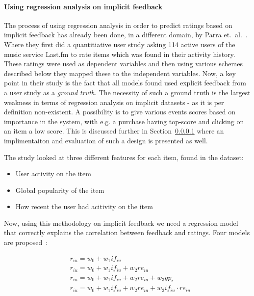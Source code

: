 \paragraph{Using regression analysis on implicit feedback}

The process of using regression analysis in order to predict ratings based on
implicit feedback has already been done, in a different domain, by Parra et.\
al.~\cite{parra2011walk}. Where they first did a quantitiative user study
asking 114 active users of the music service Last.fm to rate items which was
found in their activity history. These ratings were used as dependent variables
and then using various schemes described below they mapped these to the
independent variables. Now, a key point in their study is the fact that all
models found used explicit feedback from a user study as a \textit{ground
truth}. The necessity of such a ground truth is the largest weakness in terms
of regression analysis on implicit datasets - as it is per definition
non-existent. A possibility is to give various events scores based on
importance in the system, with e.g. a purchase having top-score and clicking on
an item a low score. This is discussed further in Section~\ref{} where an
implimentaiton and evaluation of such a design is presented as well.

The study looked at three different features for each item, found in the
dataset:

\begin{itemize}
  \item User activity on the item
  \item Global popularity of the item
  \item How recent the user had acitivity on the item
\end{itemize}

Now, using this methodology on implicit feedback we need a regression model that
correctly explains the correlation between feedback and ratings. Four models
are proposed~\cite{parra2011walk}:

\begin{equation}
  \begin{aligned}
    & r_{iu} = w_0 + w_1 if_{iu} \\
    & r_{iu} = w_0 + w_1 if_{iu} + w_2 re_{iu} \\
    & r_{iu} = w_0 + w_1 if_{iu} + w_2 re_{iu} + w_3 gp_{i} \\
    & r_{iu} = w_0 + w_1 if_{iu} + w_2 re_{iu} + w_3 if_{iu} \cdot re_{iu}
  \end{aligned}
\end{equation}

